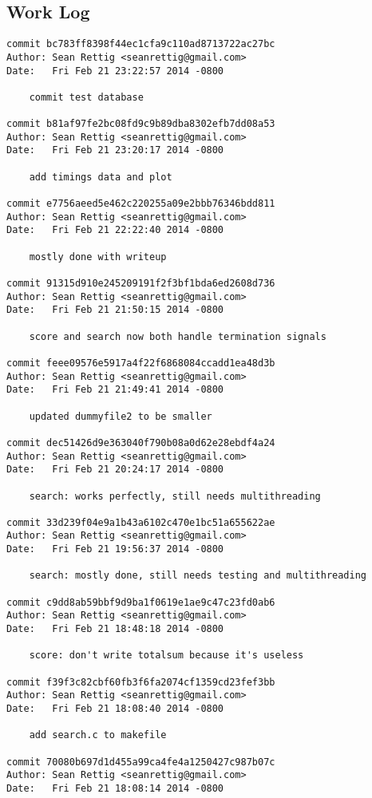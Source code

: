 \documentclass[letterpaper,10pt,fleqn]{article}
\numberwithin{equation}{section}
\begin{document}
\subsection*{Work Log}
\begin{verbatim}
commit bc783ff8398f44ec1cfa9c110ad8713722ac27bc
Author: Sean Rettig <seanrettig@gmail.com>
Date:   Fri Feb 21 23:22:57 2014 -0800

    commit test database

commit b81af97fe2bc08fd9c9b89dba8302efb7dd08a53
Author: Sean Rettig <seanrettig@gmail.com>
Date:   Fri Feb 21 23:20:17 2014 -0800

    add timings data and plot

commit e7756aeed5e462c220255a09e2bbb76346bdd811
Author: Sean Rettig <seanrettig@gmail.com>
Date:   Fri Feb 21 22:22:40 2014 -0800

    mostly done with writeup

commit 91315d910e245209191f2f3bf1bda6ed2608d736
Author: Sean Rettig <seanrettig@gmail.com>
Date:   Fri Feb 21 21:50:15 2014 -0800

    score and search now both handle termination signals

commit feee09576e5917a4f22f6868084ccadd1ea48d3b
Author: Sean Rettig <seanrettig@gmail.com>
Date:   Fri Feb 21 21:49:41 2014 -0800

    updated dummyfile2 to be smaller

commit dec51426d9e363040f790b08a0d62e28ebdf4a24
Author: Sean Rettig <seanrettig@gmail.com>
Date:   Fri Feb 21 20:24:17 2014 -0800

    search: works perfectly, still needs multithreading

commit 33d239f04e9a1b43a6102c470e1bc51a655622ae
Author: Sean Rettig <seanrettig@gmail.com>
Date:   Fri Feb 21 19:56:37 2014 -0800

    search: mostly done, still needs testing and multithreading

commit c9dd8ab59bbf9d9ba1f0619e1ae9c47c23fd0ab6
Author: Sean Rettig <seanrettig@gmail.com>
Date:   Fri Feb 21 18:48:18 2014 -0800

    score: don't write totalsum because it's useless

commit f39f3c82cbf60fb3f6fa2074cf1359cd23fef3bb
Author: Sean Rettig <seanrettig@gmail.com>
Date:   Fri Feb 21 18:08:40 2014 -0800

    add search.c to makefile

commit 70080b697d1d455a99ca4fe4a1250427c987b07c
Author: Sean Rettig <seanrettig@gmail.com>
Date:   Fri Feb 21 18:08:14 2014 -0800


\end{verbatim}
\end{document}
